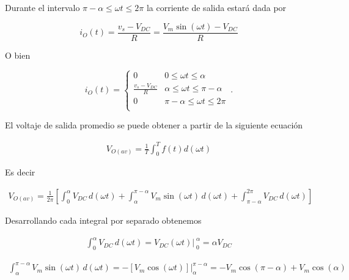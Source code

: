 \documentclass{article}
\begin{document}
\noindent Durante el intervalo $\pi - \alpha \leq \omega t \leq 2\pi$ la corriente de salida estará dada por

\begin{tcolorbox}[colback=red!5!white,colframe=red!75!black,arc=0mm,boxrule=0mm,width=(\linewidth+0.5cm)]
	\begin{equation}
		i_O(t) = \frac{v_s - V_{DC}}{R} = \frac{V_m \sin (\omega t) - V_{DC}}{R}
	\end{equation}
\end{tcolorbox}

\noindent O bien

\begin{equation}
	i_O(t) =  
	\begin{cases}
		0 \quad & 0 \leq \omega t \leq \alpha\\
		\frac{v_s - V_{DC}}{R} & \alpha \leq \omega t \leq \pi - \alpha \\
		0 \quad & \pi - \alpha \leq \omega t \leq 2 \pi\\
	\end{cases}\,.
\end{equation}

\noindent El voltaje de salida promedio se puede obtener a partir de la siguiente ecuación 

\begin{align}
	V_{O(av)} = \frac{1}{T} \int_{0}^{T} f(t) d(\omega t)
\end{align}

\noindent Es decir

\begin{align}
	V_{O(av)} = \frac{1}{2\pi} \left[ \int_{0}^{\alpha} {V_{DC} \, d(\omega t)} + \int_{\alpha}^{\pi - \alpha}{V_m \sin (\omega t) \, d(\omega t) } + \int_{\pi - \alpha}^{2\pi}{V_{DC}} \,d(\omega t) \right]
\end{align}

\noindent Desarrollando cada integral por separado obtenemos

\begin{align}
	\int_{0}^{\alpha} {V_{DC} \, d(\omega t)} = \left.{V_{DC} (\omega t)}\right|_{\;0}^{\;\alpha} = \alpha V_{DC}
\end{align}

\begin{align}
	\int_{\alpha}^{\pi - \alpha}{V_m \sin (\omega t) \, d(\omega t) } = -{\left[ V_m \cos (\omega t) \right]} \bigg\rvert_{\alpha}^{\pi - \alpha} = -V_m \cos (\pi - \alpha) + V_m \cos (\alpha)
\end{align}
\end{document}
